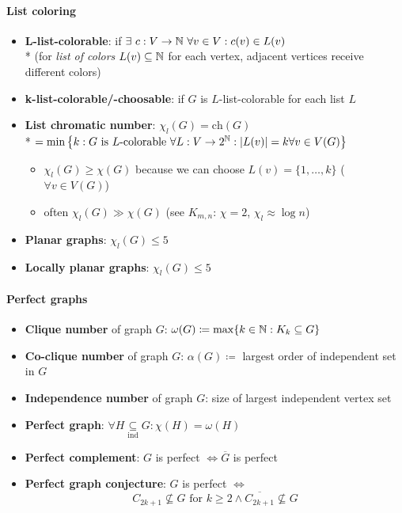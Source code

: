 \paragraph{List coloring}
\begin{itemize}
  \item \textbf{L-list-colorable}: if $ \exists \ c: V \to \mathbb{N} \ \forall v \in V : c(v) \in L(v) $ \\*
  (for \emph{list of colors} $ L(v) \subseteq \mathbb{N} $ for each vertex, adjacent vertices receive different colors) 
  \item \textbf{k-list-colorable/-choosable}: if $ G $ is $ L $-list-colorable for each list $ L $
  \item \textbf{List chromatic number}: $ \chi_l(G) = \text{ch}(G) $ \\* $ = \min\left\{ k : G \text{ is $ L $-colorable } \forall L: V \to 2^{\mathbb{N}}: \vert L(v) \vert = k \forall v \in V(G) \right\} $
  \begin{itemize}
    \item $ \chi_l(G) \geq \chi(G) $ because we can choose $ L(v) = \{ 1, \dots, k \} $ ($ \forall v \in V(G) $) 
    \item often $ \chi_l(G) \gg \chi(G) $ (see $ K_{m,n} $: $ \chi = 2 $, $ \chi_l \approx \log n $)
  \end{itemize}
  \item \textbf{Planar graphs}: $ \chi_l(G) \leq 5 $
  \item \textbf{Locally planar graphs}: $ \chi_l(G) \leq 5 $
\end{itemize}

\paragraph{Perfect graphs}
\begin{itemize}
  \item \textbf{Clique number} of graph $ G $: $ \omega(G) \coloneqq \max\{ k \in \mathbb{N} : K_k \subseteq G \} $
  \item \textbf{Co-clique number} of graph \( G \): \( \alpha(G) \coloneqq  \) largest order of independent set in \( G \)
  \item \textbf{Independence number} of graph $ G $: size of largest independent vertex set
  \item \textbf{Perfect graph}: $ \forall H \underset{\text{ind}}{\subseteq} G : \chi(H) = \omega(H) $
  \item \textbf{Perfect complement}: $ G $ is perfect $ \Leftrightarrow \overline{G} $ is perfect
  \item \textbf{Perfect graph conjecture}: $ G $ is perfect $ \Leftrightarrow $
    \begin{equation*}
      C_{2k+1} \not \subseteq G \text{ for } k \geq 2 \wedge \overline{C_{2k+1}} \not \subseteq G
    \end{equation*}
\end{itemize}